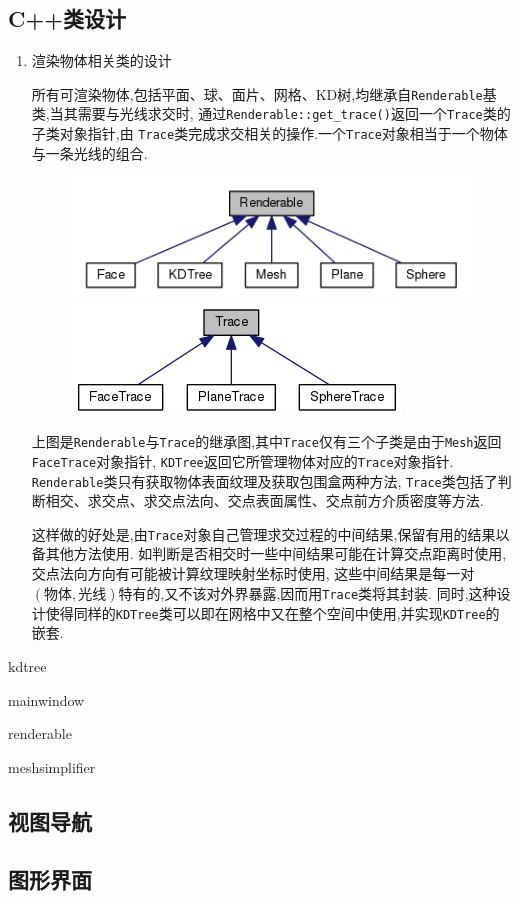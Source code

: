 \subsection{C++类设计}
\begin{enumerate}
  \item 渲染物体相关类的设计

    所有可渲染物体,包括平面、球、面片、网格、KD树,均继承自\verb|Renderable|基类,当其需要与光线求交时,
    通过\verb|Renderable::get_trace()|返回一个\verb|Trace|类的子类对象指针,由
    \verb|Trace|类完成求交相关的操作.一个\verb|Trace|对象相当于一个物体与一条光线的组合.

    \begin{figure}[H]
      \begin{minipage}[b]{0.46\linewidth}
        \centering
        \includegraphics[width=\textwidth]{res/renderable_inherit.png}
      \end{minipage}
      \begin{minipage}[b]{0.46\linewidth}
        \centering
        \includegraphics[width=\textwidth]{res/trace_inherit.png}
      \end{minipage}
    \end{figure}

    上图是\verb|Renderable|与\verb|Trace|的继承图,其中\verb|Trace|仅有三个子类是由于\verb|Mesh|返回\verb|FaceTrace|对象指针,
    \verb|KDTree|返回它所管理物体对应的\verb|Trace|对象指针.
    \verb|Renderable|类只有获取物体表面纹理及获取包围盒两种方法,
    \verb|Trace|类包括了判断相交、求交点、求交点法向、交点表面属性、交点前方介质密度等方法.

    这样做的好处是,由\verb|Trace|对象自己管理求交过程的中间结果,保留有用的结果以备其他方法使用.
    如判断是否相交时一些中间结果可能在计算交点距离时使用,交点法向方向有可能被计算纹理映射坐标时使用,
    这些中间结果是每一对$ (物体,光线)$特有的,又不该对外界暴露,因而用\verb|Trace|类将其封装.
    同时,这种设计使得同样的\verb|KDTree|类可以即在网格中又在整个空间中使用,并实现\verb|KDTree|的嵌套.

\end{enumerate}

kdtree

mainwindow

renderable

meshsimplifier

\subsection{视图导航}

\subsection{图形界面}
